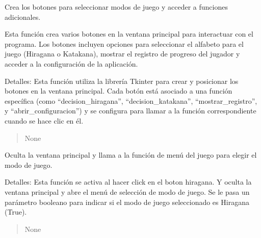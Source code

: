 \documentclass[letterpaper,10pt,spanish]{sphinxmanual}
\begin{document}
\begin{fulllineitems}
\begin{fulllineitems}
\begin{quote}
\begin{description}
\end{description}\end{quote}

\end{fulllineitems}


\begin{fulllineitems}
\label{\detokenize{main:main.MenuPrincipal.crear_botones}}
\pysigstartsignatures
{}
\pysigstopsignatures
\sphinxAtStartPar
Crea los botones para seleccionar modos de juego y acceder a funciones adicionales.

\sphinxAtStartPar
Esta función crea varios botones en la ventana principal para interactuar con el programa. Los botones
incluyen opciones para seleccionar el alfabeto para el juego (Hiragana o Katakana), mostrar el registro de
progreso del jugador y acceder a la configuración de la aplicación.

\sphinxAtStartPar
Detalles:
Esta función utiliza la librería Tkinter para crear y posicionar los botones en la ventana principal. Cada
botón está asociado a una función específica (como “decision\_hiragana”, “decision\_katakana”, “mostrar\_registro”,
y “abrir\_configuracion”) y se configura para llamar a la función correspondiente cuando se hace clic en él.
\begin{quote}\begin{description}
\sphinxAtStartPar
None

\end{description}\end{quote}

\end{fulllineitems}


\begin{fulllineitems}
\label{\detokenize{main:main.MenuPrincipal.decision_hiragana}}
\pysigstartsignatures
{}
\pysigstopsignatures
\sphinxAtStartPar
Oculta la ventana principal y llama a la función de menú del juego para elegir el modo de juego.

\sphinxAtStartPar
Detalles:
Esta función se activa al hacer click en el boton hiragana. Y oculta la ventana principal y abre el
menú de selección de modo de juego. Se le pasa un parámetro booleano para indicar si el modo de juego
seleccionado es Hiragana (True).
\begin{quote}\begin{description}
\sphinxAtStartPar
None


\end{description}
\end{quote}
\end{fulllineitems}
\end{fulllineitems}
\end{document}
